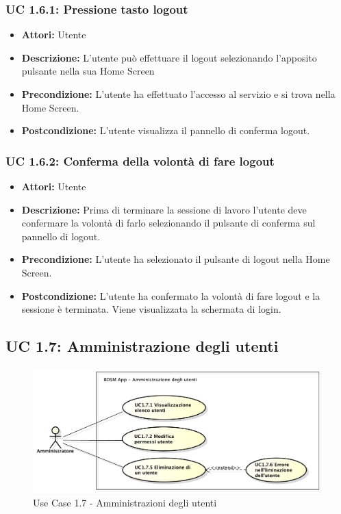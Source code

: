 \subsubsection{UC 1.6.1: Pressione tasto logout}

\begin{itemize}
    \item \textbf{Attori:} Utente
    \item \textbf{Descrizione:} L'utente può effettuare il logout selezionando l'apposito pulsante nella sua Home Screen
    \item \textbf{Precondizione:} L'utente ha effettuato l'accesso al servizio e si trova nella Home Screen.
    \item \textbf{Postcondizione:} L'utente visualizza il pannello di conferma logout.
\end{itemize}

\subsubsection{UC 1.6.2: Conferma della volontà di fare logout}

\begin{itemize}
    \item \textbf{Attori:} Utente
    \item \textbf{Descrizione:} Prima di terminare la sessione di lavoro l'utente deve confermare la volontà di farlo selezionando il pulsante di conferma sul pannello di logout.
    \item \textbf{Precondizione:} L'utente ha selezionato il pulsante di logout nella Home Screen.
    \item \textbf{Postcondizione:} L'utente ha confermato la volontà di fare logout e la sessione è terminata. Viene visualizzata la schermata di login.
\end{itemize}

\clearpage


\subsection{UC 1.7: Amministrazione degli utenti}

\begin{figure}[!htbp]
    \centering
    \centerline{\includegraphics[scale=0.45]{./images/UC1_7.pdf}}
    \caption{Use Case 1.7 - Amministrazioni degli utenti}
\end{figure}

